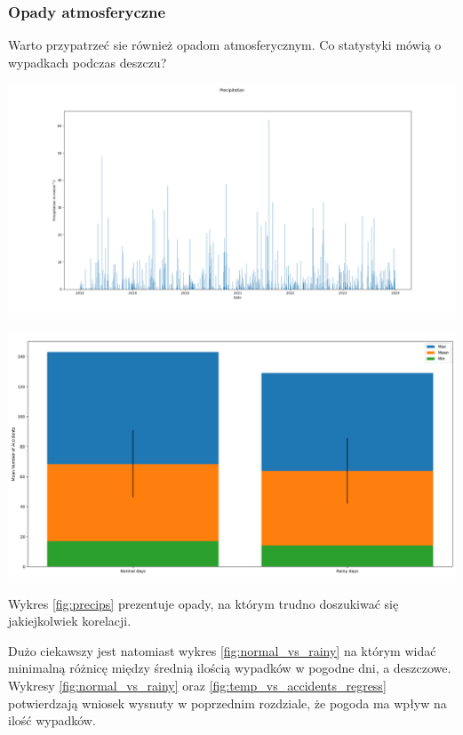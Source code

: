 \documentclass{article}
\begin{document}
\subsubsection{Opady atmosferyczne}

Warto przypatrzeć sie również opadom atmosferycznym. Co statystyki mówią o wypadkach podczas deszczu? 

 \begin{center}
    \includegraphics[scale=0.3]{visualization/precips.png}
    \captionsetup{hypcap=false}
    \label{fig:precips}
\end{center}

 \begin{center}
    \includegraphics[scale=0.3]{visualization/normal_vs_rainy.png}
    \captionsetup{hypcap=false}
    \label{fig:normal_vs_rainy}
\end{center}

Wykres \ref{fig:precips} prezentuje opady, na którym trudno doszukiwać się jakiejkolwiek korelacji.

Dużo ciekawszy jest natomiast wykres \ref{fig:normal_vs_rainy} na którym widać minimalną różnicę między średnią ilością wypadków w pogodne dni, a deszczowe.
Wykresy \ref{fig:normal_vs_rainy} oraz \ref{fig:temp_vs_accidents_regress} potwierdzają wniosek wysnuty w poprzednim rozdziale, że pogoda ma wpływ na ilość wypadków.
\end{document}

